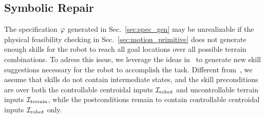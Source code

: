 \documentclass[letterpaper, 10 pt, conference]{ieeeconf}
\begin{document}

\subsection{Symbolic Repair}\label{sec:symbolic_repair}
The specification $\varphi$ generated in Sec.~\ref{sec:spec_gen} may be unrealizable
if the physical feasibility checking in Sec.~\ref{sec:motion_primitive} does not generate enough skills for the robot to reach all goal locations over all possible terrain combinations.
%
To adress this issue, we leverage the ideas in~\cite{pacheck2022physically} 
to
generate
new skill suggestions necessary for the robot to accomplish the task.
Different from~\cite{pacheck2022physically}, we assume that skills do not contain intermediate states,
and the skill preconditions
are over both the controllable centroidal inputs ${\mathcal I}_{\textrm{robot}}$ and uncontrollable terrain inputs ${\mathcal I}_{\textrm{terrain}}$, 
while the postconditions remain to contain 
controllable
centroidal inputs ${\mathcal I}_{\textrm{robot}}$ only.
\end{document}
